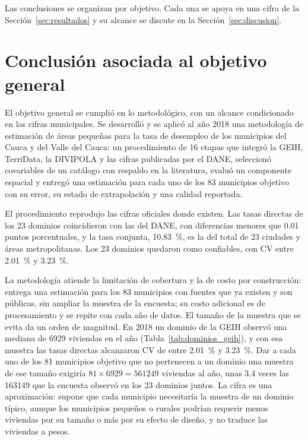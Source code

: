 
\label{sec:conclusion}

Las conclusiones se organizan por objetivo. Cada una se apoya en una cifra de la Sección~\ref{sec:resultados} y su alcance se discute en la Sección~\ref{sec:discusion}.

\section{Conclusión asociada al objetivo general}

El objetivo general se cumplió en lo metodológico, con un alcance condicionado en las cifras municipales. Se desarrolló y se aplicó al año 2018 una metodología de estimación de áreas pequeñas para la tasa de desempleo de los municipios del Cauca y del Valle del Cauca: un procedimiento de 16 etapas que integró la GEIH, TerriData, la DIVIPOLA y las cifras publicadas por el DANE, seleccionó covariables de un catálogo con respaldo en la literatura, evaluó un componente espacial y entregó una estimación para cada uno de los 83 municipios objetivo con su error, su estado de extrapolación y una calidad reportada.

El procedimiento reprodujo las cifras oficiales donde existen. Las tasas directas de los 23 dominios coincidieron con las del DANE, con diferencias menores que 0.01 puntos porcentuales, y la tasa conjunta, 10.83~\%, es la del total de 23 ciudades y áreas metropolitanas. Los 23 dominios quedaron como confiables, con CV entre 2.01~\% y 3.23~\%.

La metodología atiende la limitación de cobertura y la de costo por construcción: entrega una estimación para los 83 municipios con fuentes que ya existen y son públicas, sin ampliar la muestra de la encuesta; su costo adicional es de procesamiento y se repite con cada año de datos. El tamaño de la muestra que se evita da un orden de magnitud. En 2018 un dominio de la GEIH observó una mediana de \num{6929} viviendas en el año (Tabla~\ref{tab:dominios_geih}), y con esa muestra las tasas directas alcanzaron CV de entre 2.01~\% y 3.23~\%. Dar a cada uno de los 81 municipios objetivo que no pertenecen a un dominio una muestra de ese tamaño exigiría $81 \times \num{6929} = \num{561249}$ viviendas al año, unas 3.4 veces las \num{163149} que la encuesta observó en los 23 dominios juntos. La cifra es una aproximación: supone que cada municipio necesitaría la muestra de un dominio típico, aunque los municipios pequeños o rurales podrían requerir menos viviendas por su tamaño o más por su efecto de diseño, y no traduce las viviendas a pesos.

